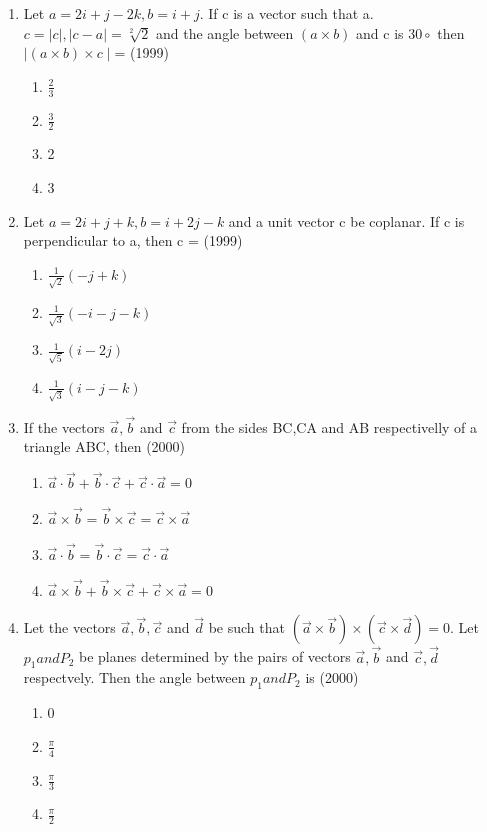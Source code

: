 \documentclass[12pt]{article}
\providecommand{\brak}[1]{\ensuremath{\left(#1\right)}}
\begin{document}
\begin{enumerate}
\item Let $a=2i+j-2k, b=i+j$. If c is a vector such that a. $c=\mid c \mid, \mid c-a \mid =\sqrt[2]{2}$ and the angle between $\brak{a \times b}$ and c is $30\circ$ then $\mid\brak{a \times b}\times c \mid$=   (1999)
\begin{enumerate}	
\item $\frac{2}{3}$
\item $\frac{3}{2}$
\item 2
\item 3
\end{enumerate}
\item Let $a=2i+j+k, b=i+2j-k$ and a unit vector c be coplanar. If c is perpendicular to a, then c =     (1999)
\begin{enumerate}
\item $\frac{1}{\sqrt{2}} \brak{-j+k}$  
\item $\frac{1}{\sqrt{3}} \brak{-i-j-k}$   
\item $\frac{1}{\sqrt{5}} \brak{i-2j}$  
\item $\frac{1}{\sqrt{3}} \brak{i-j-k}$  
\end{enumerate}
\item If the vectors $\vec{a},\vec{b}$ and $\vec{c}$ from the sides BC,CA and AB respectivelly of a triangle ABC, then   (2000)
\begin{enumerate}	
\item $\vec{a}\cdot\vec{b}+\vec{b}\cdot\vec{c}+\vec{c}\cdot\vec{a}=0$
\item $\vec{a}\times\vec{b}=\vec{b}\times\vec{c}=\vec{c}\times\vec{a}$
\item $\vec{a}\cdot\vec{b}=\vec{b}\cdot\vec{c}=\vec{c}\cdot\vec{a}$
\item $\vec{a}\times\vec{b}+\vec{b}\times\vec{c}+\vec{c}\times\vec{a}=0$
\end{enumerate}
\item Let the vectors $\vec{a},\vec{b}, \vec{c}$ and $\vec{d}$ be such that $\brak{\vec{a}\times\vec{b}}\times\brak{\vec{c}\times\vec{d}}=0$. Let $p_1 and P_2$ be planes determined by the pairs of vectors  $\vec{a},\vec{b}$ and $\vec{c}, \vec{d}$ respectvely. Then the angle between $p_1 and P_2$  is (2000)
\begin{enumerate}	
\item  0 
\item  $\frac{\pi}{4}$
\item  $\frac{\pi}{3}$
\item  $\frac{\pi}{2}$
\end{enumerate}

\end{enumerate}
\end{document}
